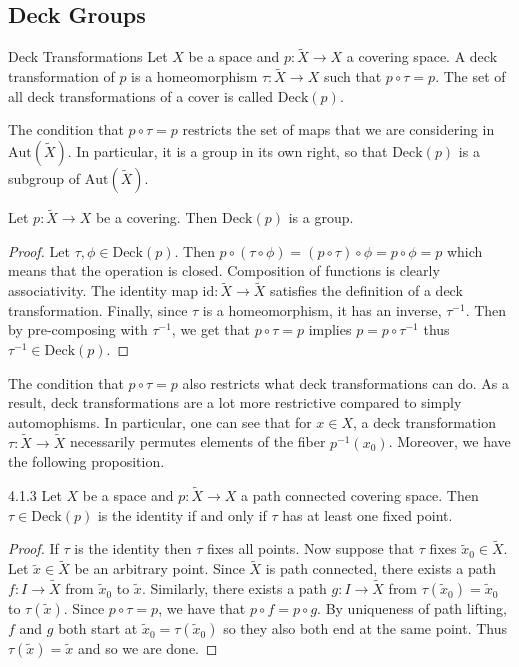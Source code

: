 \documentclass[a4paper]{article}
\begin{document}
\subsection{Deck Groups}
\begin{defn}{Deck Transformations}{} Let $X$ be a space and $p:\tilde{X}\to X$ a covering space. A deck transformation of $p$ is a homeomorphism $\tau:\tilde{X}\to X$ such that $p\circ\tau=p$. The set of all deck transformations of a cover is called $\text{Deck}(p)$. 
\end{defn}

The condition that $p\circ\tau=p$ restricts the set of maps that we are considering in $\text{Aut}(\tilde{X})$. In particular, it is a group in its own right, so that $\text{Deck}(p)$ is a subgroup of $\text{Aut}(\tilde{X})$. 

\begin{prp}{}{} Let $p:\tilde{X}\to X$ be a covering. Then $\text{Deck}(p)$ is a group. \tcbline
\begin{proof}
Let $\tau,\phi\in\text{Deck}(p)$. Then $p\circ(\tau\circ\phi)=(p\circ\tau)\circ\phi=p\circ\phi=p$ which means that the operation is closed. Composition of functions is clearly associativity. The identity map $\text{id}:\tilde{X}\to\tilde{X}$ satisfies the definition of a deck transformation. Finally, since $\tau$ is a homeomorphism, it has an inverse, $\tau^{-1}$. Then by pre-composing with $\tau^{-1}$, we get that $p\circ\tau=p$ implies $p=p\circ\tau^{-1}$ thus $\tau^{-1}\in\text{Deck}(p)$. 
\end{proof}
\end{prp}

The condition that $p\circ\tau=p$ also restricts what deck transformations can do. As a result, deck transformations are a lot more restrictive compared to simply automophisms. In particular, one can see that for $x\in X$, a deck transformation $\tau:\tilde{X}\to\tilde{X}$ necessarily permutes elements of the fiber $p^{-1}(x_0)$. Moreover, we have the following proposition. 

\begin{prp}{}{4.1.3} Let $X$ be a space and $p:\tilde{X}\to X$ a path connected covering space. Then $\tau\in\text{Deck}(p)$ is the identity if and only if $\tau$ has at least one fixed point. \tcbline
\begin{proof}
If $\tau$ is the identity then $\tau$ fixes all points. Now suppose that $\tau$ fixes $\tilde{x}_0\in\tilde{X}$. Let $\tilde{x}\in\tilde{X}$ be an arbitrary point. Since $\tilde{X}$ is path connected, there exists a path $f:I\to\tilde{X}$ from $\tilde{x}_0$ to $\tilde{x}$. Similarly, there exists a path $g:I\to\tilde{X}$ from $\tau(\tilde{x}_0)=\tilde{x}_0$ to $\tau(\tilde{x})$. Since $p\circ\tau=p$, we have that $p\circ f=p\circ g$. By uniqueness of path lifting, $f$ and $g$ both start at $\tilde{x}_0=\tau(\tilde{x}_0)$ so they also both end at the same point. Thus $\tau(\tilde{x})=\tilde{x}$ and so we are done. 
\end{proof}
\end{prp}
\end{document}
